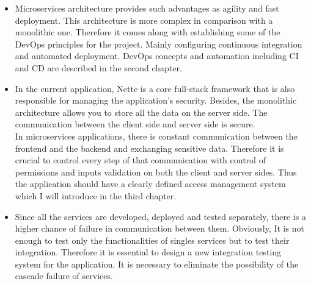 \begin{itemize}
    \item Microservices architecture provides such advantages as agility and fast deployment. This architecture is more complex in comparison with a monolithic one. Therefore it comes along with establishing some of the DevOps principles for the project. Mainly configuring continuous integration and automated deployment. DevOps concepts and automation including CI and CD are described in the second chapter.
    \item In the current application, Nette is a core full-stack framework that is also responsible for managing the application's security. Besides, the monolithic architecture allows you to store all the data on the server side. The communication between the client side and server side is secure.\\
    In microservices applications, there is constant communication between the frontend and the backend and exchanging sensitive data. Therefore it is crucial to control every step of that communication with control of permissions and inputs validation on both the client and server sides. Thus the application should have a clearly defined access management system which I will introduce in the third chapter.
    \item Since all the services are developed, deployed and tested separately, there is a higher chance of failure in communication between them. Obviously, It is not enough to test only the functionalities of singles services but to test their integration. Therefore it is essential to design a new integration testing system for the application. It is necessary to eliminate the possibility of the cascade failure of services.
\end{itemize}
